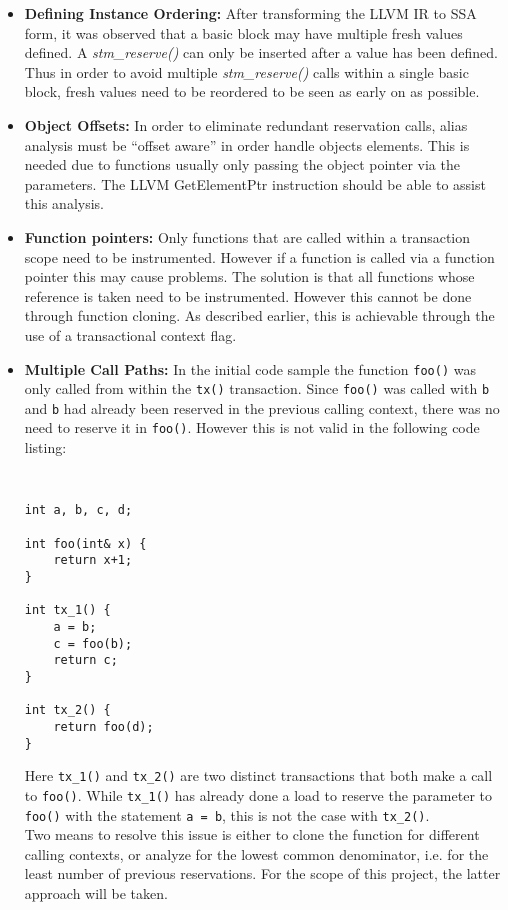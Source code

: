 \documentclass[letterpaper,twocolumn,10pt]{article}
\begin{document}
\begin{itemize}

\item {\bf Defining Instance Ordering:} After transforming the LLVM IR to SSA form, it was observed that a basic block may have multiple fresh values defined. A \emph{stm\_reserve()} can only be inserted after a value has been defined. Thus in order to avoid multiple \emph{stm\_reserve()} calls within a single basic block, fresh values need to be reordered to be seen as early on as possible.

\item  {\bf Object Offsets:} In order to eliminate redundant reservation calls, alias analysis must be ``offset aware'' in order handle objects elements. This is needed due to functions usually only passing the object pointer via the parameters. The LLVM GetElementPtr instruction should be able to assist this analysis.

\item  {\bf Function pointers:} Only functions that are called within a transaction scope need to be instrumented. However if a function is called via a function pointer this may cause problems. The solution is that all functions whose reference is taken need to be instrumented. However this cannot be done through function cloning. As described earlier, this is achievable through the use of a transactional context flag.

\item  {\bf Multiple Call Paths:} In the initial code sample the function {\tt foo()} was only called from within the {\tt tx()} transaction. Since {\tt foo()} was called with {\tt b} and {\tt b} had already been reserved in the previous calling context, there was no need to reserve it in {\tt foo()}. However this is not valid in the following code listing:

{\tt \small
\begin{verbatim}
int a, b, c, d;

int foo(int& x) {
    return x+1;
}

int tx_1() {
    a = b;
    c = foo(b);
    return c;
}

int tx_2() {
    return foo(d);
}
\end{verbatim}
}

Here {\tt tx\_1()} and {\tt tx\_2()} are two distinct transactions that both make a call to {\tt foo()}. While {\tt tx\_1()} has already done a load to reserve the parameter to {\tt foo()} with the statement {\tt a = b}, this is not the case with {\tt tx\_2()}.\\

Two means to resolve this issue is either to clone the function for different calling contexts, or analyze for the lowest common denominator, i.e. for the least number of previous reservations. For the scope of this project, the latter approach will be taken.\\

\end{itemize}
\end{document}
